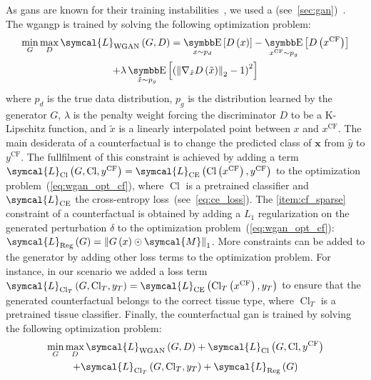 \documentclass[../main.tex]{subfiles}
\begin{document}
		As \glspl{gan} are known for their training instabilities~\cite{Salimans2016ImprovedTF,Arjovsky2017TowardsPM}, we used a  (see~\cref{sec:gan})~\cite{WGANGP}.
		The \gls{wgangp} is trained by solving the following optimization problem:
		\begin{multline}
			\min_{G} \max_{D} \symcal{L}_{\text{WGAN}}\left(G,D\right) = \E_{x\sim p_{d}}\left[ D\left(x\right)\right] - \E_{x^{\text{CF}}\sim p_{g}}\left[ D\left(x^{\text{CF}}\right)\right] \\ + \lambda \E_{\tilde{x}\sim p_{g}}\left[ {\left( {\left\|\nabla_{\tilde{x}}D\left(\tilde{x}\right) \right\|}_{2} -1 \right)}^{2}\right] \label{eq:wgan_opt_cf}
		\end{multline}
		where \(p_{d}\) is the true data distribution, \(p_{g}\) is the distribution learned by the generator \(G\), \(\lambda\) is the penalty weight forcing the discriminator \(D\) to be a K-Lipschitz function, and \(\tilde{x}\) is a linearly interpolated point between \(x\) and \(x^{\text{CF}}\).
		The main desiderata of a counterfactual is to change the predicted class of \(\symbf{x}\) from \(\hat{y}\) to \(y^{\text{CF}}\).
		The fullfilment of this constraint is achieved by adding a term \(\symcal{L}_{\operatorname{Cl}}\left(G,\operatorname{Cl}, y^{\text{CF}} \right) = \symcal{L}_{\text{CE}}\left(\operatorname{Cl}\left(x^{\text{CF}}\right),y^{\text{CF}}\right) \) to the optimization problem~(\cref{eq:wgan_opt_cf}), where \(\operatorname{Cl}\) is a pretrained classifier and \(\symcal{L}_{\text{CE}}\) the cross-entropy loss~(see~\cref{eq:ce_loss}).
		The \ref{item:cf_sparse} constraint of a counterfactual is obtained by adding a \(L_{1}\) regularization on the generated perturbation \(\delta\) to the optimization problem~(\cref{eq:wgan_opt_cf}): \(\symcal{L}_{\text{Reg}}\left(G\right) = \left\|G\left(x\right) \odot \symcal{M}\right\|_{1}\).
		More constraints can be added to the generator by adding other loss terms to the optimization problem.
		For instance, in our scenario we added a loss term \(\symcal{L}_{\operatorname{Cl}_{T}}\left(G,\operatorname{Cl}_{T}, y_{T} \right) = \symcal{L}_{\text{CE}}\left(\operatorname{Cl}_{T}\left(x^{\text{CF}}\right),y_{T}\right)\) to ensure that the generated counterfactual belongs to the correct tissue type, where \(\operatorname{Cl}_{T}\) is a pretrained tissue classifier.
		Finally, the counterfactual \gls{gan} is trained by solving the following optimization problem:
		\begin{multline}
			\min_{G} \max_{D} \symcal{L}_{\text{WGAN}}\left(G,D\right) + \symcal{L}_{\operatorname{Cl}}\left(G,\operatorname{Cl}, y^{\text{CF}}\right)\\ + \symcal{L}_{\operatorname{Cl}_{T}}\left(G,\operatorname{Cl}_{T}, y_{T}\right) + \symcal{L}_{\text{Reg}}\left(G\right)
		\end{multline}
\end{document}

